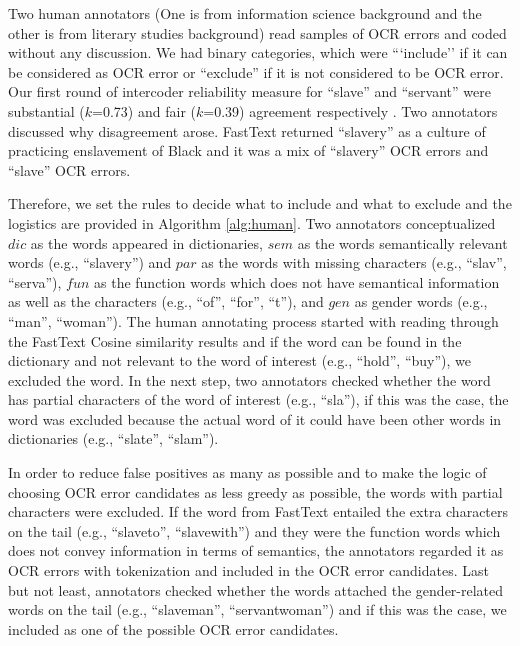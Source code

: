\documentclass[11pt]{article}
\begin{document}
Two human annotators (One is from information science background and the other is from literary studies background) read samples of OCR errors and coded without any discussion. 
We had binary categories, which were ```include'' if it can be considered as OCR error or ``exclude'' if it is not considered to be OCR error. 
Our first round of intercoder reliability measure \citep{cohen_coefficient_1960}
for ``slave'' and ``servant'' were substantial ($k$=0.73) and fair ($k$=0.39) agreement respectively \citep{viera_understanding_nodate}. 
Two annotators discussed why disagreement arose. FastText returned ``slavery'' as a culture of practicing enslavement of Black and it was a mix of ``slavery'' OCR errors and ``slave'' OCR errors. 

Therefore, we set the rules to decide what to include and what to exclude and the logistics are provided in Algorithm \ref{alg:human}. 
Two annotators conceptualized $dic$ as the words appeared in dictionaries, $sem$ as the words semantically relevant words (e.g., ``slavery'') and $par$  as the words with missing characters (e.g., ``slav'', ``serva''), $fun$ as the function words which does not have semantical information as well as the characters (e.g., ``of'', ``for'', ``t''), and $gen$ as gender words (e.g., ``man'', ``woman''). 
The human annotating process started with reading through the FastText Cosine similarity results and if the word can be found in the dictionary and not relevant to the word of interest (e.g., ``hold'', ``buy''), we excluded the word. 
In the next step, two annotators checked whether the word has partial characters of the word of interest (e.g., ``sla''), if this was the case, the word was excluded because the actual word of it could have been  other words in dictionaries (e.g., ``slate'', ``slam''). 

In order to reduce false positives as many as possible and to make the logic of choosing OCR error candidates as less greedy as possible, the words with partial characters were excluded. 
If the word from FastText entailed the extra characters on the tail (e.g., ``slaveto'', ``slavewith'') and they were the function words which does not convey information in terms of semantics, the annotators regarded it as OCR errors with tokenization and included in the OCR error candidates. Last but not least, annotators checked whether the words attached the gender-related words on the tail (e.g., ``slaveman'', ``servantwoman'') and if this was the case, we included as one of the possible OCR error candidates. 
\end{document}
